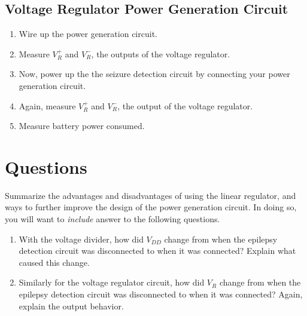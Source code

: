 \documentclass[12pt,oneside]{article}
\begin{document}
\subsection{Voltage Regulator Power Generation Circuit}
\begin{enumerate}
\item Wire up the power generation circuit.
\item Measure $V_{R}^+$ and $V_{R}^-$, the outputs of the voltage regulator.
\item Now, power up the the seizure detection circuit by connecting your power generation circuit.
\item Again, measure $V_{R}^+$ and $V_{R}^-$, the output of the voltage regulator.
\item Measure battery power consumed.
\end{enumerate}

\section{Questions}
Summarize the advantages and disadvantages of using the linear regulator, and ways to further improve the design of the power generation circuit.  In doing so, you will want to\textit{ include} answer to the following questions. 
\begin{enumerate}
\item With the voltage divider, how did $V_{DD}$ change from when the epilepsy detection circuit was disconnected to when it was connected? Explain what caused this change.
\item Similarly for the voltage regulator circuit, how did $V_{R}$ change from when the epilepsy detection circuit was disconnected to when it was connected? Again, explain the output behavior.
\end{enumerate}
\end{document}
